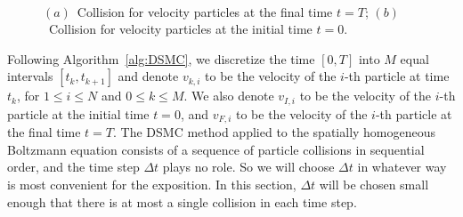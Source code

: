 \documentclass[times,final,nopreprintline]{elsarticle}
\newcommand{\bgamma}{\boldsymbol \gamma}
\begin{document}
\begin{figure} 
\begin{center}
\caption{$(a)$~Collision for velocity particles at the final time $t=T$; $(b)$~Collision for velocity particles at the initial time $t=0$.}~\label{fig:collision1}
\end{center}
\end{figure}
Following Algorithm~\ref{alg:DSMC}, we discretize the time $[0,T]$ into $M$ equal intervals $[t_k,t_{k+1}]$ and denote $v_{k,i}$ to be the velocity of the $i$-th particle at time $t_k$, for $1\leq i\leq N$ and $0\leq k\leq M$. We also denote $v_{I,i}$ to be the velocity of the $i$-th particle at the initial time $t=0$, and $v_{F,i}$ to be the velocity of the $i$-th particle at the final time $t=T$. The DSMC method applied to the spatially homogeneous Boltzmann equation consists of a sequence of particle collisions in sequential order, and the time step $\Delta t$ plays no role. So we will choose $\Delta t$ in whatever way is most convenient for the exposition. In this section, $\Delta t$ will be chosen small enough that there is at most a single collision in each time step.
\end{document}
